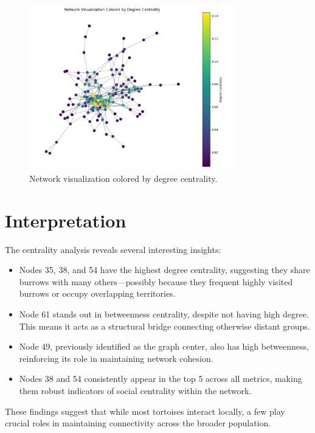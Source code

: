 \documentclass[12pt]{report}
\begin{document}
\begin{figure}[h!]
    \centering
    \includegraphics[width=0.8\textwidth]{Images/Centrality Measures.png}
    \caption{Network visualization colored by degree centrality.}
    \label{fig:centrality-visual}
\end{figure}

\section*{Interpretation}

The centrality analysis reveals several interesting insights:

\begin{itemize}
    \item Nodes 35, 38, and 54 have the highest degree centrality, suggesting they share burrows with many others—possibly because they frequent highly visited burrows or occupy overlapping territories.
    \item Node 61 stands out in betweenness centrality, despite not having high degree. This means it acts as a structural bridge connecting otherwise distant groups.
    \item Node 49, previously identified as the graph center, also has high betweenness, reinforcing its role in maintaining network cohesion.
    \item Nodes 38 and 54 consistently appear in the top 5 across all metrics, making them robust indicators of social centrality within the network.
\end{itemize}

These findings suggest that while most tortoises interact locally, a few play crucial roles in maintaining connectivity across the broader population.
\end{document}
